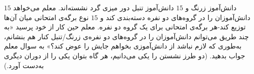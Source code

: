 \EXERCISE
$15$
دانش‌آموز زرنگ و
$15$
دانش‌آموز تنبل دور میزی گرد نشسته‌اند. معلم می‌خواهد دانش‌آموزان را در گروه‌های دو نفره دسته‌بندی کند و
$15$
نوع برگه‌ی امتحانی میان آن‌ها توزیع کند-هر برگه‌ی امتحانی برای یک گروه دو نفره. معلم حین کار از خود پرسید «به چند طریق می‌توانم دانش‌آموزان را در گروه‌های دو نفره‌ی زرنگ/تنبل کنار هم بنشانم، به‌طوری که لازم نباشد از دانش‌آموزی بخواهم جایش را عوض کند؟» به سوال معلم جواب بدهید. (دو طرز نشستن را یکی می‌دانیم، هر گاه بتوان یکی را از دوران دیگری به‌دست آورد.)